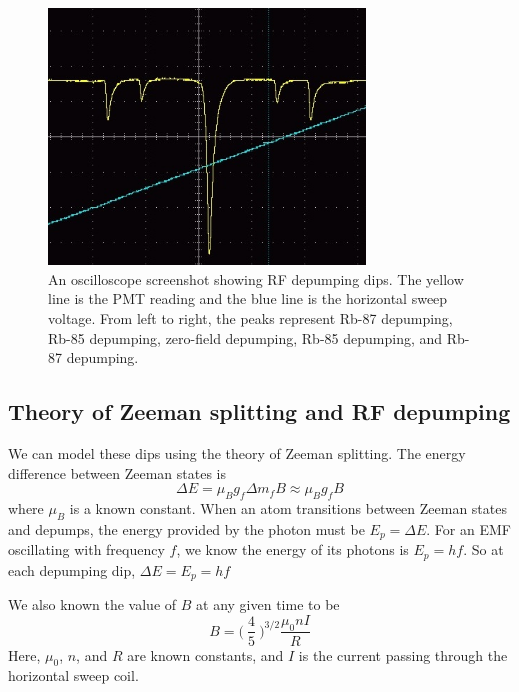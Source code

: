 \documentclass[12pt, letterpaper]{article}
\begin{document}
\begin{figure}[!h]
    \centering
    \includegraphics[width=0.75\textwidth]{experiment4/figures/weak.jpg}
    \caption{An oscilloscope screenshot showing RF depumping dips. The yellow line is the PMT reading and the blue line is the horizontal sweep voltage. From left to right, the peaks represent Rb-87 depumping, Rb-85 depumping, zero-field depumping, Rb-85 depumping, and Rb-87 depumping. }
    \label{fig:weak-scope}
\end{figure}

\subsection{Theory of Zeeman splitting and RF depumping}

We can model these dips using the theory of Zeeman splitting. The energy difference between Zeeman states is
\begin{equation}\label{eq:zeeman}
    \Delta E = \mu_B g_f \Delta m_f B \approx \mu_B g_f B
\end{equation}
where $\mu_B$ is a known constant. When an atom transitions between Zeeman states and depumps, the energy provided by the photon must be $E_p = \Delta E$. For an EMF oscillating with frequency $f$, we know the energy of its photons is $E_p = hf$. So at each depumping dip, $\Delta E = E_p = hf$

We also known the value of $B$ at any given time to be
\begin{equation}\label{eq:helmholtz}
    B = \Bigr(\:\frac{4}{5} \: \Bigr )^{3/2} \frac{\mu_0 n I}{R}
\end{equation}
Here, $\mu_0$, $n$, and $R$ are known constants, and $I$ is the current passing through the horizontal sweep coil. 
\end{document}

